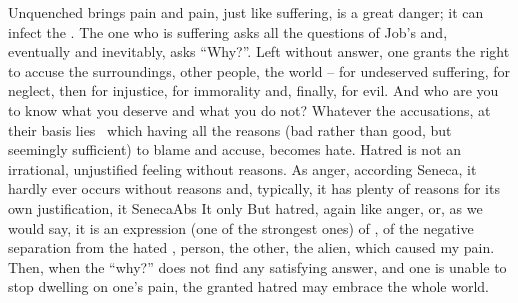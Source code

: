 \pa Unquenched  brings pain and pain, just like suffering, is a great
danger; it can infect the .   The one who is suffering asks all the questions of
Job's and, eventually and inevitably, asks ``Why?''.  Left without answer, one
grants  the right to accuse the surroundings, other people, the
world -- for undeserved suffering, for neglect, then for injustice, for
immorality and, finally, for evil.
 And who are you to know what you
deserve and what you do not? 
Whatever the accusations, at their basis 
lies \No\ which having all the reasons (bad rather than good, but seemingly
sufficient) to blame and accuse, becomes hate. Hatred is not an irrational,
unjustified feeling without reasons. As anger, according Seneca, it hardly ever occurs
without reasons and, typically, it has plenty of reasons for its own
justification, it \citet{does necessarily presuppose an injury, either done, or
  conceived, or feared.}{SenecaAbs}{} It only
 But hatred, again like anger,  or, as we would say, it is an
expression (one of the strongest ones) of , of the negative
separation from the hated , person, the other, the alien, which
caused my pain.  Then, when the ``why?''  does not find any satisfying answer,
and one is unable to stop dwelling on one's pain, the granted hatred may embrace
the whole world.

